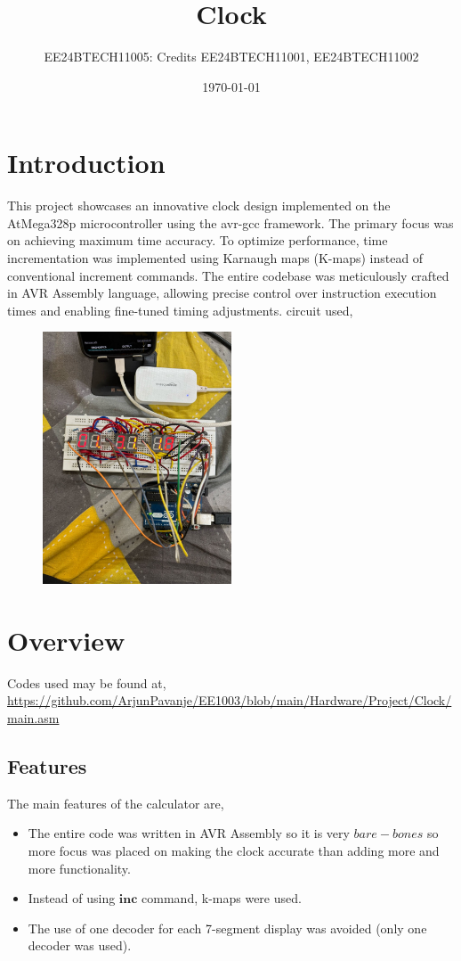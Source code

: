\documentclass[a4paper,12pt]{article}
\title{Clock}
\author{EE24BTECH11005: Credits EE24BTECH11001, EE24BTECH11002}
\date{\today}
\begin{document}
\maketitle

\section*{Introduction}
This project showcases an innovative clock design implemented on the AtMega328p microcontroller using the avr-gcc framework. The primary focus was on achieving maximum time accuracy. To optimize performance, time incrementation was implemented using Karnaugh maps (K-maps) instead of conventional increment commands. The entire codebase was meticulously crafted in AVR Assembly language, allowing precise control over instruction execution times and enabling fine-tuned timing adjustments. \newline
circuit used,
\begin{figure}[h!]
  \begin{center}
    \includegraphics[width=0.5\textwidth]{figs/circuit.png}
  \end{center}
  \caption{}\label{fig:Circuit}
\end{figure}
\section*{Overview}
Codes used may be found at, \url{https://github.com/ArjunPavanje/EE1003/blob/main/Hardware/Project/Clock/main.asm}
\subsection*{Features}
The main features of the calculator are,
\begin{itemize}
    \item The entire code was written in AVR Assembly so it is very $bare-bones$ so more focus was placed on making the clock accurate than adding more and more functionality.
    \item Instead of using $\mathbf{inc}$ command, k-maps were used. 
    \item The use of one decoder for each 7-segment display was avoided (only one decoder was used).

\end{itemize}
\end{document}
